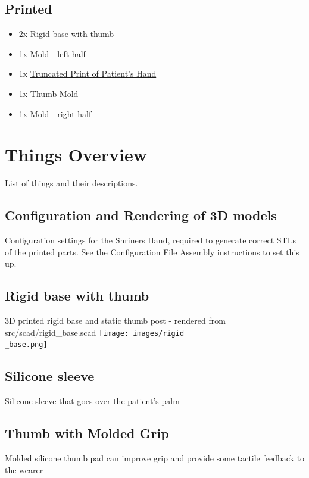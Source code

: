 \documentclass[11pt]{article}
\begin{document}
\subsection{Printed}
\begin{itemize}
\item 2x \hyperlink{thing_rigid\_base}{Rigid base with thumb}
\item 1x \hyperlink{thing_mold\_left\_half}{Mold - left half}
\item 1x \hyperlink{thing_truncated\_hand}{Truncated Print of Patient's Hand}
\item 1x \hyperlink{thing_thumb\_mold}{Thumb Mold}
\item 1x \hyperlink{thing_mold\_right\_half}{Mold - right half}
\end{itemize}

\newpage

\section{Things Overview}
List of things and their descriptions.

\hypertarget{thing_config\_file}{\subsection{Configuration and Rendering of 3D models}}
Configuration settings for the Shriners Hand, required to generate correct STLs of the printed parts. See the Configuration File Assembly instructions to set this up.

\hypertarget{thing_rigid\_base}{\subsection{Rigid base with thumb}}
3D printed rigid base and static thumb post - rendered from src/scad/rigid_base.scad
\texttt{[image: images/rigid\\\_base.png]}

\hypertarget{thing_silicone\_sleeve}{\subsection{Silicone sleeve}}
Silicone sleeve that goes over the patient's palm

\hypertarget{thing_molded\_thumb}{\subsection{Thumb with Molded Grip}}
Molded silicone thumb pad can improve grip and provide some tactile feedback to the wearer
\end{document}
